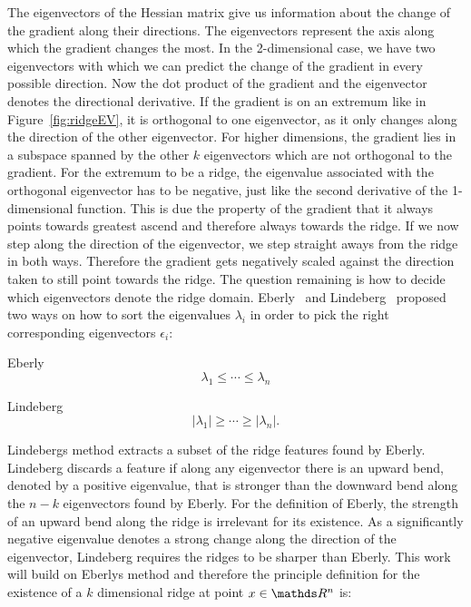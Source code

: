 The eigenvectors of the Hessian matrix give us information about the
change of the gradient along their directions. The eigenvectors
represent the axis along which the gradient changes the most. In the
2-dimensional case, we have two eigenvectors with which we can predict
the change of the gradient in every possible direction. Now the dot
product of the gradient and the eigenvector denotes the directional
derivative. If the gradient is on an extremum like in
Figure~\ref{fig:ridgeEV}, it is orthogonal to one eigenvector, as it
only changes along the direction of the other eigenvector. For higher
dimensions, the gradient lies in a subspace spanned by the other $k$
eigenvectors which are not orthogonal to the gradient. For the extremum
to be a ridge, the eigenvalue associated with the orthogonal eigenvector
has to be negative, just like the second derivative of the 1-dimensional
function. This is due the property of the gradient that it always points
towards greatest ascend and therefore always towards the ridge. If we
now step along the direction of the eigenvector, we step straight aways
from the ridge in both ways. Therefore the gradient gets negatively
scaled against the direction taken to still point towards the ridge. The
question remaining is how to decide which eigenvectors denote the ridge
domain. Eberly~\cite{Eberly} and Lindeberg~\cite{Lindeberg} proposed two
ways on how to sort the eigenvalues $\lambda_i$ in order to pick the
right corresponding eigenvectors $\epsilon_i$:\\
\begin{inparaenum}[(a)]
  \item Eberly
  \begin{equation}\label{eq:Eberly}
   \lambda_1 \leq \cdots \leq \lambda_n
  \end{equation}
  \item Lindeberg
  \begin{equation}
    \lvert \lambda_1 \rvert \geq \cdots \geq \lvert \lambda_n \rvert.
  \end{equation}
\end{inparaenum}
\noindent Lindebergs method extracts a subset of the ridge features
found by Eberly. Lindeberg discards a feature if along any eigenvector
there is an upward bend, denoted by a positive eigenvalue, that is
stronger than the downward bend along the $n-k$ eigenvectors found by
Eberly. For the definition of Eberly, the strength of an upward bend
along the ridge is irrelevant for its existence. As a significantly
negative eigenvalue denotes a strong change along the direction of the
eigenvector, Lindeberg requires the ridges to be sharper than Eberly.
This work will build on Eberlys method and therefore the principle
definition for the existence of a $k$ dimensional ridge at point $x
\in \real^n$ is:\\

